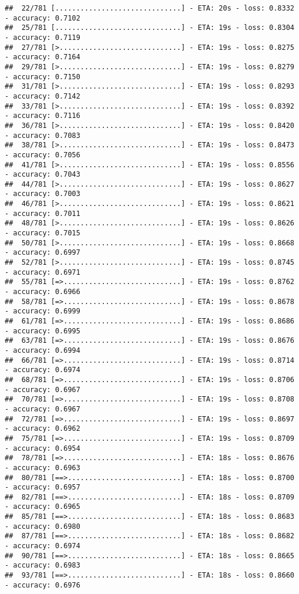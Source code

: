 \documentclass[
]{article}
\begin{document}
\begin{verbatim}
##  22/781 [..............................] - ETA: 20s - loss: 0.8332 - accuracy: 0.7102
##  25/781 [..............................] - ETA: 19s - loss: 0.8304 - accuracy: 0.7119
##  27/781 [>.............................] - ETA: 19s - loss: 0.8275 - accuracy: 0.7164
##  29/781 [>.............................] - ETA: 19s - loss: 0.8279 - accuracy: 0.7150
##  31/781 [>.............................] - ETA: 19s - loss: 0.8293 - accuracy: 0.7142
##  33/781 [>.............................] - ETA: 19s - loss: 0.8392 - accuracy: 0.7116
##  36/781 [>.............................] - ETA: 19s - loss: 0.8420 - accuracy: 0.7083
##  38/781 [>.............................] - ETA: 19s - loss: 0.8473 - accuracy: 0.7056
##  41/781 [>.............................] - ETA: 19s - loss: 0.8556 - accuracy: 0.7043
##  44/781 [>.............................] - ETA: 19s - loss: 0.8627 - accuracy: 0.7003
##  46/781 [>.............................] - ETA: 19s - loss: 0.8621 - accuracy: 0.7011
##  48/781 [>.............................] - ETA: 19s - loss: 0.8626 - accuracy: 0.7015
##  50/781 [>.............................] - ETA: 19s - loss: 0.8668 - accuracy: 0.6997
##  52/781 [>.............................] - ETA: 19s - loss: 0.8745 - accuracy: 0.6971
##  55/781 [=>............................] - ETA: 19s - loss: 0.8762 - accuracy: 0.6966
##  58/781 [=>............................] - ETA: 19s - loss: 0.8678 - accuracy: 0.6999
##  61/781 [=>............................] - ETA: 19s - loss: 0.8686 - accuracy: 0.6995
##  63/781 [=>............................] - ETA: 19s - loss: 0.8676 - accuracy: 0.6994
##  66/781 [=>............................] - ETA: 19s - loss: 0.8714 - accuracy: 0.6974
##  68/781 [=>............................] - ETA: 19s - loss: 0.8706 - accuracy: 0.6967
##  70/781 [=>............................] - ETA: 19s - loss: 0.8708 - accuracy: 0.6967
##  72/781 [=>............................] - ETA: 19s - loss: 0.8697 - accuracy: 0.6962
##  75/781 [=>............................] - ETA: 19s - loss: 0.8709 - accuracy: 0.6954
##  78/781 [=>............................] - ETA: 18s - loss: 0.8676 - accuracy: 0.6963
##  80/781 [==>...........................] - ETA: 18s - loss: 0.8700 - accuracy: 0.6957
##  82/781 [==>...........................] - ETA: 18s - loss: 0.8709 - accuracy: 0.6965
##  85/781 [==>...........................] - ETA: 18s - loss: 0.8683 - accuracy: 0.6980
##  87/781 [==>...........................] - ETA: 18s - loss: 0.8682 - accuracy: 0.6974
##  90/781 [==>...........................] - ETA: 18s - loss: 0.8665 - accuracy: 0.6983
##  93/781 [==>...........................] - ETA: 18s - loss: 0.8660 - accuracy: 0.6976

\end{verbatim}
\end{document}
